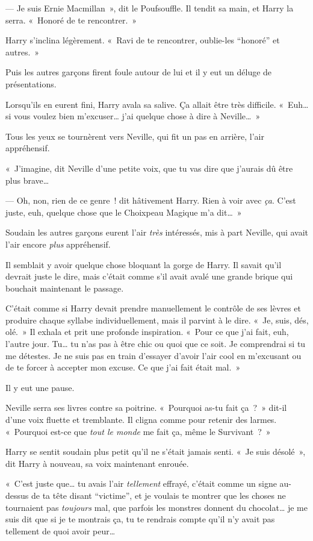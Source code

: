 --- Je suis Ernie Macmillan~», dit le Poufsouffle. Il tendit sa main, et Harry la serra. «~Honoré de te rencontrer.~»

Harry s'inclina légèrement. «~Ravi de te rencontrer, oublie-les “honoré” et autres.~»

Puis les autres garçons firent foule autour de lui et il y eut un déluge de présentations.

Lorsqu'ils en eurent fini, Harry avala sa salive. Ça allait être très difficile. «~Euh… si vous voulez bien m'excuser… j'ai quelque chose à dire à Neville…~»

Tous les yeux se tournèrent vers Neville, qui fit un pas en arrière, l'air appréhensif.

«~J'imagine, dit Neville d'une petite voix, que tu vas dire que j'aurais dû être plus brave…

--- Oh, non, rien de ce genre~! dit hâtivement Harry. Rien à voir avec \emph{ça}. C'est juste, euh, quelque chose que le Choixpeau Magique m'a dit…~»

Soudain les autres garçons eurent l'air \emph{très} intéressés, mis à part Neville, qui avait l'air encore \emph{plus} appréhensif.

Il semblait y avoir quelque chose bloquant la gorge de Harry. Il savait qu'il devrait juste le dire, mais c'était comme s'il avait avalé une grande brique qui bouchait maintenant le passage.

C'était comme si Harry devait prendre manuellement le contrôle de ses lèvres et produire chaque syllabe individuellement, mais il parvint à le dire. «~Je, suis, dés, olé.~» Il exhala et prit une profonde inspiration. «~Pour ce que j'ai fait, euh, l'autre jour. Tu… tu n'as pas à être chic ou quoi que ce soit. Je comprendrai si tu me détestes. Je ne suis pas en train d'essayer d'avoir l'air cool en m'excusant ou de te forcer à accepter mon excuse. Ce que j'ai fait était mal.~»

Il y eut une pause.

Neville serra ses livres contre sa poitrine. «~Pourquoi as-tu fait ça~?~» dit-il d'une voix fluette et tremblante. Il cligna comme pour retenir des larmes. «~Pourquoi est-ce que \emph{tout le monde} me fait ça, même le Survivant~?~»

Harry se sentit soudain plus petit qu'il ne s'était jamais senti. «~Je suis désolé~», dit Harry à nouveau, sa voix maintenant enrouée.

«~C'est juste que… tu avais l'air \emph{tellement} effrayé, c'était comme un signe au-dessus de ta tête disant “victime”, et je voulais te montrer que les choses ne tournaient pas \emph{toujours} mal, que parfois les monstres donnent du chocolat… je me suis dit que si je te montrais ça, tu te rendrais compte qu'il n'y avait pas tellement de quoi avoir peur…

